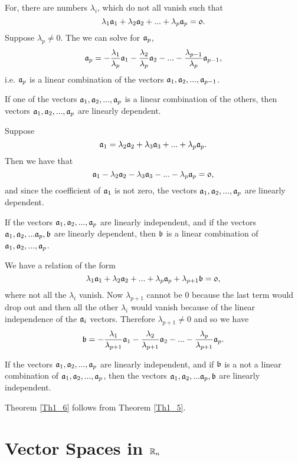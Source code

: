 For, there are numbers $\lambda_i$, which do not all vanish such that $$\lambda_1 \mathfrak{a}_1 + \lambda_2 \mathfrak{a}_2 +...+ \lambda_p \mathfrak{a}_p = \mathfrak{0}.$$ Suppose $\lambda_p \ne 0$. The we can solve for $\mathfrak{a}_p$,
$$\mathfrak{a}_p = -{\lambda_1\over \lambda_p}\mathfrak{a}_1 -{\lambda_2\over \lambda_p}\mathfrak{a}_2 - ... - {\lambda_{p-1}\over \lambda_p} \mathfrak{a}_{p-1},$$ i.e. $\mathfrak{a}_p$ is a linear combination of the vectors $\mathfrak{a}_1, \mathfrak{a}_2, ..., \mathfrak{a}_{p-1}$.  

\begin{theorem}
If one of the vectors $\mathfrak{a}_1, \mathfrak{a}_2, ..., \mathfrak{a}_p$ is a linear combination of the others, then vectors $\mathfrak{a}_1,\mathfrak{a}_2,...,\mathfrak{a}_p$ are linearly dependent.\label{Th1_4}
\end{theorem}

Suppose $$\mathfrak{a}_1 = \lambda_2 \mathfrak{a}_2 + \lambda_3 \mathfrak{a}_3 +... + \lambda_p \mathfrak{a}_p.$$ Then we have that 
$$\mathfrak{a}_1 - \lambda_2 \mathfrak{a}_2 - \lambda_3 \mathfrak{a}_3 -... - \lambda_p \mathfrak{a}_p = \mathfrak{0},$$ and since the coefficient of $\mathfrak{a}_1$ is not zero, the vectors $\mathfrak{a}_1, \mathfrak{a}_2, ... , \mathfrak{a}_p$ are linearly dependent. 

\begin{theorem}
If the vectors $\mathfrak{a}_1, \mathfrak{a}_2, ..., \mathfrak{a}_p$ are linearly independent, and if the vectors $\mathfrak{a}_1, \mathfrak{a}_2,...\mathfrak{a}_p,\mathfrak{b}$ are linearly dependent, then $\mathfrak{b}$ is a linear
combination of $\mathfrak{a}_1, \mathfrak{a}_2, ..., \mathfrak{a}_p$.\label{Th1_5}
\end{theorem}

We have a relation of the form $$\lambda_1 \mathfrak{a}_1 + \lambda_2 \mathfrak{a}_2 +... + \lambda_p \mathfrak{a}_p + \lambda_{p+1} \mathfrak{b} =\mathfrak{0},$$ where not all the $\lambda_i$ vanish. Now
$\lambda_{p+1}$ cannot be 0 because the last term would drop out and then all the other $\lambda_i$ would vanish because of the linear independence of the $\mathfrak{a}_i$ vectors. Therefore
$\lambda_{p+1} \ne 0$ and so we have 
$$\mathfrak{b} = -{\lambda_1\over \lambda_{p+1}}\mathfrak{a}_1 -{\lambda_2\over \lambda_{p+1}}\mathfrak{a}_2 - ... - {\lambda_p\over \lambda_{p+1}} \mathfrak{a}_p.$$


\begin{theorem}
If the vectors $\mathfrak{a}_1, \mathfrak{a}_2, ..., \mathfrak{a}_p$ are linearly independent, and if $\mathfrak{b}$ is a not a linear combination of $\mathfrak{a}_1, \mathfrak{a}_2, ..., \mathfrak{a}_p$, then the vectors
$\mathfrak{a}_1, \mathfrak{a}_2,...\mathfrak{a}_p,\mathfrak{b}$ are linearly independent.\label{Th1_6}
\end{theorem}

Theorem \ref{Th1_6} follows from Theorem \ref{Th1_5}.

\section{Vector Spaces in $\mathbb{R}_n$}

